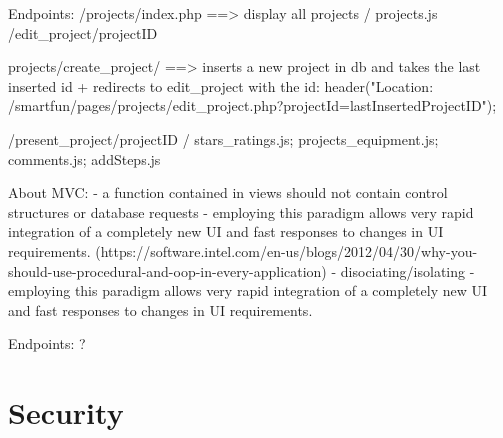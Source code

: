 Endpoints: 
/projects/index.php ==> display all projects / projects.js
/edit_project/{projectID}

projects/create_project/ ==> inserts a new project in db and takes the last inserted id + redirects to edit_project with the id:  header("Location: /smartfun/pages/projects/edit_project.php?projectId=lastInsertedProjectID");

/present_project/{projectID} / stars_ratings.js; projects_equipment.js; comments.js; addSteps.js
	




About MVC: 
- a function contained in views should not contain control structures or database requests 
- employing this paradigm allows very rapid integration of a completely new UI and fast responses to changes in UI requirements. (https://software.intel.com/en-us/blogs/2012/04/30/why-you-should-use-procedural-and-oop-in-every-application)
- disociating/isolating
- employing this paradigm allows very rapid integration of a completely new UI and fast responses to changes in UI requirements.




Endpoints: ?

\section{Security}












